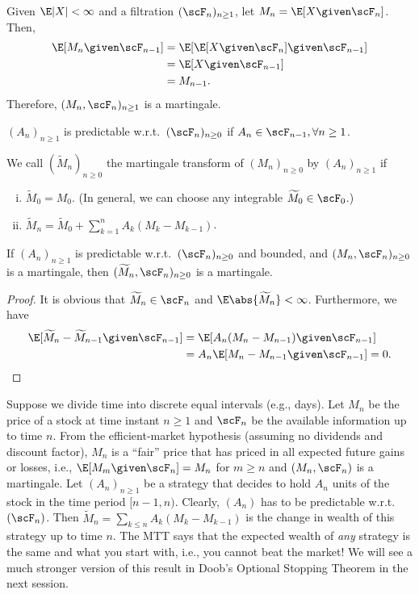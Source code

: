 \documentclass[../aipt.tex]{subfiles}
\begin{document}
\begin{Example}\label{ex:wk12_mex_5}
Given $\E|X|<\infty$ and a filtration $(\scF_n)_{n\geq1}$, let $M_n=\E[X \given \scF_n]$. Then, 
\begin{align*}
\E [M_n \given \scF_{n-1}]
&=\E [{\E[X \given \scF_n]} \given \scF_{n-1}]\\
&=\E[X \given \scF_{n-1}]\\
&=M_{n-1}.
\end{align*}
Therefore, $(M_{n},\scF_n)_{n\geq1}$ is a martingale.
\end{Example}

\begin{Definition}
$(A_n)_{n\geq1}$ is predictable w.r.t.\ $(\scF_n)_{n\geq 0}$ if $A_n \in \scF_{n-1}, \forall n  \geq 1$.
\end{Definition}

We call $(\widetilde{M}_n)_{n\geq0}$ the martingale transform of $(M_n)_{n\geq0}$ by $(A_n)_{n\geq1}$ if
\begin{enumerate}[(i)]
\item $\widetilde{M}_0 = M_0$. (In general, we can choose any integrable $\widetilde{M}_0\in\scF_0$.)
\item $\widetilde{M}_n = \widetilde{M}_0 + \sum_{k=1}^n A_k(M_k-M_{k-1})$. 
\end{enumerate}
%
\begin{Theorem}[MTT] \label{wk12:MTT}
If $(A_n)_{n\geq1}$ is predictable w.r.t.\ $(\scF_n)_{n\geq0}$ and bounded, and $(M_n,\scF_n)_{n\geq0}$ is a martingale, then $(\widetilde{M}_n, \scF_n)_{n\geq0}$ is a martingale.
\end{Theorem}
\begin{proof}
It is obvious that $\widetilde{M}_n \in \scF_n$ and $\E\abs{\widetilde{M}_n} < \infty$. Furthermore, we have 
\begin{align*}
\E[\widetilde{M}_n - \widetilde{M}_{n-1} \given \scF_{n-1}]
&= \E[A_n(M_n - M_{n-1}) \given \scF_{n-1}] \\
&= A_n\E[M_n - M_{n-1} \given \scF_{n-1}] = 0.
\end{align*}
\end{proof}

\begin{Example}
Suppose we divide time into discrete equal intervals (e.g., days). Let $M_n$ be the price of a stock at time instant $n\geq1$ and $\scF_n$ be the available information up to time $n$. From the efficient-market hypothesis (assuming no dividends and discount factor), $M_n$ is a ``fair'' price that has priced in all expected future gains or losses, i.e., $\E[M_m \given \scF_n] = M_n$ for $m\geq n$ and $(M_n,\scF_n)$ is a martingale. Let $(A_n)_{n\geq1}$ be a strategy that decides to hold $A_n$ units of the stock in the time period $[n-1,n)$. Clearly, $(A_n)$ has to be predictable w.r.t.\ $(\scF_n)$. Then $\widetilde{M}_n= \sum_{k\leq n} A_k(M_k-M_{k-1})$ is the change in wealth of this strategy up to time $n$. The MTT says that the expected wealth of \emph{any} strategy is the same and what you start with, i.e., you cannot beat the market! We will see a much stronger version of this result in Doob's Optional Stopping Theorem in the next session.
\end{Example}

%

\end{document}

